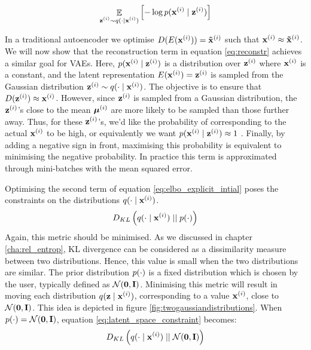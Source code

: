 	\begin{equation}
		\mathop{\mathbb{E}}_{\substack{\mathbf{z}^{(i)} \sim q (\cdot \mid \mathbf{x}^{(i)})}} \left[ -\log p (\mathbf{x}^{(i)} \mid \mathbf{z}^{(i)}) \right] \label{eq:reconstr}	
	\end{equation}

	In a traditional autoencoder we optimise $D(E(\mathbf{x}^{(i)})) = \mathbf{\tilde{x}}^{(i)}$ such that $\mathbf{x}^{(i)} \approx \mathbf{\tilde{x}}^{(i)}$. We will now show that the reconstruction term in equation \ref{eq:reconstr} achieves a similar goal for VAEs. Here, $p (\mathbf{x}^{(i)} \mid \mathbf{z}^{(i)})$ is a distribution over $\mathbf{z}^{(i)}$ where $\mathbf{x}^{(i)}$ is a constant, and the latent representation $E(\mathbf{x}^{(i)}) = \mathbf{z}^{(i)}$ is sampled from the Gaussian distribution $\mathbf{z}^{(i)} \sim q (\cdot \mid \mathbf{x}^{(i)})$. The objective is to ensure that $D(\mathbf{z}^{(i)}) \approx \mathbf{x}^{(i)}$. However, since $\mathbf{z}^{(i)}$ is sampled from a Gaussian distribution, the $\mathbf{z}^{(i)}$'s close to the mean $\bm{\mu}^{(i)}$ are more likely to be sampled than those further away. Thus, for these $\mathbf{z}^{(i)}$'s, we'd like the probability of corresponding to the actual $\mathbf{x}^{(i)}$ to be high, or equivalently we want $p (\mathbf{x}^{(i)} \mid \mathbf{z}^{(i)}) \approx 1$ \cite{cinelliVariationalMethodsMachine2021}. Finally, by adding a negative sign in front, maximising this probability is equivalent to minimising the negative probability. In practice this term is approximated through mini-batches with the mean squared error. %
	

	Optimising the second term of equation \ref{eq:elbo_explicit_intial} poses the constraints on the distributions $q (\cdot \mid \mathbf{x}^{(i)})$. 
	\begin{equation}
		D_{KL} \left(  q (\cdot \mid \mathbf{x}^{(i)})  \mid \mid  p(\cdot)  \right) \label{eq:latent_space_constraint}		
	\end{equation}
	Again, this metric should be minimised. As we discussed in chapter \ref{cha:rel_entrop}, KL divergence can be considered as a dissimilarity measure between two distributions. Hence, this value is small when the two distributions are similar. The prior distribution $p(\cdot)$ is a fixed distribution which is chosen by the user, typically defined as $\mathcal{N}(\bm{\mathbf{0}}, \mathbf{I})$. Minimising this metric will result in moving each distribution $q (\mathbf{z} \mid \mathbf{x}^{(i)})$, corresponding to a value $\mathbf{x}^{(i)}$, close to $\mathcal{N}(\bm{\mathbf{0}}, \mathbf{I})$. This idea is depicted in figure \ref{fig:twogaussiandistributions}. When $p(\cdot) = \mathcal{N}(\bm{\mathbf{0}}, \mathbf{I})$, equation \ref{eq:latent_space_constraint} becomes:
	$$D_{KL} \left(  q (\cdot \mid \mathbf{x}^{(i)})  \mid \mid  \mathcal{N}(\bm{\mathbf{0}}, \mathbf{I})  \right)$$
	
